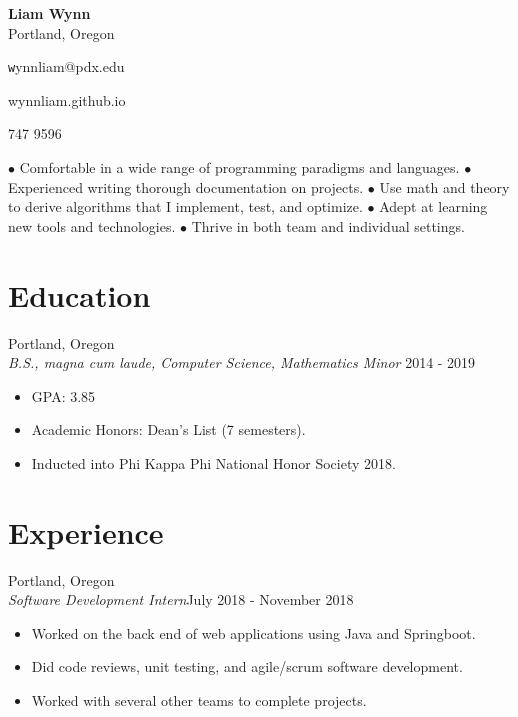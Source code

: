 \documentclass[12pt]{article}
\newcommand\textline[4][t]{%
  \par\smallskip\noindent\parbox[#1]{.333\textwidth}{\raggedright\texttt#2}%
  \parbox[#1]{.333\textwidth}{\centering#3}%
  \parbox[#1]{.333\textwidth}{\raggedleft#4}\par\smallskip%
}
\begin{document}
	\begin{center}
		\noindent \Large{\textbf{Liam Wynn}}\\
		\noindent \small{Portland, Oregon}
	\end{center}

	\begin{flushleft}
	\textline[t]{wynnliam@pdx.edu}{wynnliam.github.io}{503 747 9596}
	\noindent\makebox[\linewidth]{\rule{\textwidth}{0.4pt}}
	\end{flushleft}

	 $\bullet$ Comfortable in a wide range of programming paradigms and languages. $\bullet$ Experienced writing thorough documentation on projects.  $\bullet$ Use math and theory to derive algorithms that I implement, test, and optimize. $\bullet$ Adept at learning new tools and technologies. $\bullet$ Thrive in both team and individual settings.

	\section*{Education}
	\hfill Portland, Oregon \\
 	\noindent \emph {B.S., magna cum laude, Computer Science, Mathematics Minor} \hfill 2014 - 2019
	\begin{itemize}[noitemsep]
		\item GPA: 3.85
		\item Academic Honors: Dean's List (7 semesters).
		\item Inducted into Phi Kappa Phi National Honor Society 2018.
	\end{itemize}

	\section*{Experience}
	\hfill Portland, Oregon\\
	\noindent \emph{Software Development Intern}\hfill July 2018 - November 2018
	\begin{itemize}[noitemsep]
		\item Worked on the back end of web applications using Java and Springboot.
		\item  Did code reviews, unit testing, and agile/scrum software development.
		\item  Worked with several other teams to complete projects.
	\end{itemize}
\end{document}
